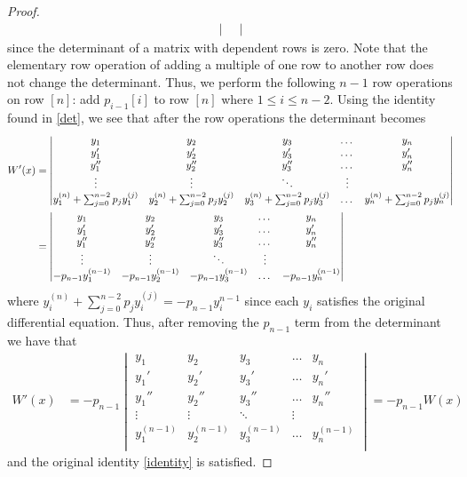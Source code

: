 \documentclass[12pt]{article}
\theoremstyle{definition}
\begin{document}
\begin{proof}
\begin{align}
\begin{vmatrix}
    \end{vmatrix}
  \end{align}
  since the determinant of a matrix with dependent rows is zero. Note that
  the elementary row operation of adding a multiple of one row to another row does not
  change the determinant. Thus, we perform the following $n-1$ row operations on
  row $[n]$:  add $p_{i-1}[i]$ to row $[n]$ where $1\leq i \leq n-2$. Using the
  identity found in \eqref{det}, we see that
  after the row operations the determinant becomes
  \begin{align*}\label{pn}
    W'(x) &=
    \begin{vmatrix}
      y_1 & y_2 & y_3 & \dots & y_n \\
      y_1' & y_2' & y_3' & \dots & y_n' \\
      y_1'' & y_2'' & y_3''& \dots & y_n'' \\
      \vdots & \vdots & \ddots & \vdots \\
      y_1^{(n)} + \sum_{j=0}^{n-2} p_jy_1^{(j)} & y_2^{(n)} + \sum_{j=0}^{n-2} p_jy_2^{(j)}& y_3^{(n)} + \sum_{j=0}^{n-2} p_jy_3^{(j)} & \dots & y_n^{(n)} + \sum_{j=0}^{n-2} p_jy_n^{(j)} \\
    \end{vmatrix} \notag \\
    &=
    \begin{vmatrix}
      y_1 & y_2 & y_3 & \dots & y_n \\
      y_1' & y_2' & y_3' & \dots & y_n' \\
      y_1'' & y_2'' & y_3''& \dots & y_n'' \\
      \vdots & \vdots & \ddots & \vdots \\
      -p_{n-1}y_1^{(n-1)} & -p_{n-1}y_2^{(n-1)}& -p_{n-1}y_3^{(n-1)} & \dots & -p_{n-1}y_n^{(n-1)} \\
    \end{vmatrix}
  \end{align*}
  where $y_i^{(n)} + \sum_{j=0}^{n-2} p_jy_i^{(j)} = -p_{n-1}y_i^{n-1}$ since each $y_i$
  satisfies the original differential equation. Thus, after removing the
  $p_{n-1}$ term from the determinant we have that
  \begin{align*}
     W'(x) &=
     -p_{n-1}
     \begin{vmatrix}
       y_1 & y_2 & y_3 & \dots & y_n \\
       y_1' & y_2' & y_3' & \dots & y_n' \\
       y_1'' & y_2'' & y_3''& \dots & y_n'' \\
       \vdots & \vdots & \ddots & \vdots \\
       y_1^{(n-1)} & y_2^{(n-1)}& y_3^{(n-1)} & \dots & y_n^{(n-1)} \\
     \end{vmatrix}
     = -p_{n-1}W(x)
  \end{align*}
  and the original identity \eqref{identity} is satisfied.
\end{proof}
\end{document}

